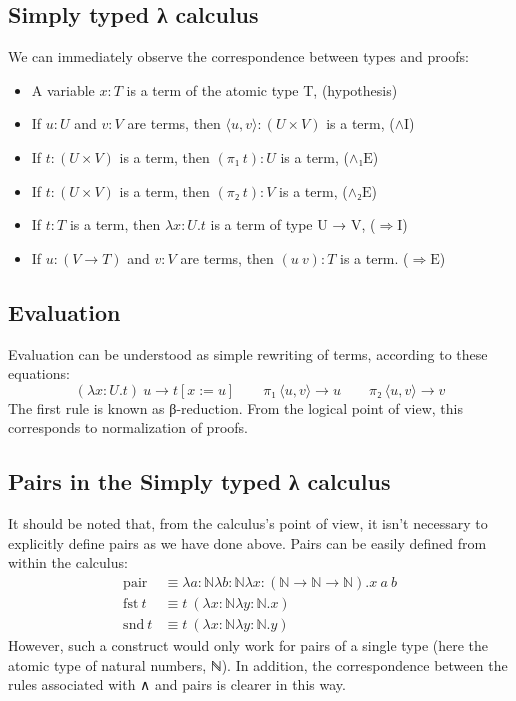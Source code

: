 \documentclass[12pt]{article}
\begin{document}
\subsection{Simply typed λ calculus}
\label{simply}
We can immediately observe the correspondence between types and proofs:
\begin{itemize}
    \item A variable $x:T$ is a term of the atomic type T, \hfill (hypothesis)
    \item If $u:U$ and $v:V$ are terms, then $⟨u,v⟩:(U × V)$ is a term, \hfill ($\mathrm{∧I}$)
    \item If $t:(U × V)$ is a term, then $(π₁ \ t):U$ is a term, \hfill ($\mathrm{∧₁E}$)
    \item If $t:(U × V)$ is a term, then $(π₂ \ t):V$ is a term, \hfill ($\mathrm{∧₂E}$)
    \item If $t:T$ is a term, then $λx:U.t$ is a term of type U → V, \hfill ($\mathrm{⇒I}$)
    \item If $u:(V → T)$ and $v:V$ are terms, then $(u \ v):T$ is a term. \hfill ($\mathrm{⇒E}$)
\end{itemize}

\subsection{Evaluation}
Evaluation can be understood as simple rewriting of terms, according to these equations:
\[(λx:U.t) \ u → t[x:=u] \qquad π₁ \ ⟨u,v⟩ → u \qquad π₂ \ ⟨u,v⟩ → v\]
The first rule is known as β-reduction. From the logical point of view, this corresponds to normalization of proofs.

\subsection{Pairs in the Simply typed λ calculus}
\label{crappairs}
It should be noted that, from the calculus's point of view, it isn't necessary to explicitly define pairs as we have done above. Pairs can be easily defined from within the calculus:
\begin{align*}
    \mathrm{pair} &≡ λa:ℕλb:ℕλx:(ℕ → ℕ → ℕ).x \ a \ b\\
    \mathrm{fst} \ t &≡ t \ (λx:ℕλy:ℕ.x)\\
    \mathrm{snd} \ t &≡ t \ (λx:ℕλy:ℕ.y)
\end{align*}
However, such a construct would only work for pairs of a single type (here the atomic type of natural numbers, ℕ). In addition, the correspondence between the rules associated with ∧ and pairs is clearer in this way.
\end{document}
